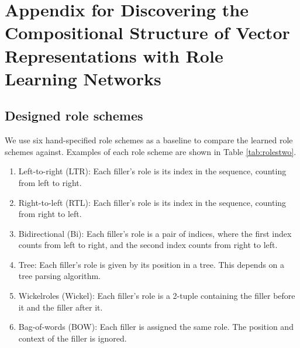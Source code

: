 \appendix 
\makeatletter
{}
\makeatother
\renewcommand{\thechapter}{\Alph{chapter}}

\chapter{Appendix for Discovering the Compositional Structure of Vector Representations with Role Learning Networks} \label{chap:appendix-a}

\section{Designed role schemes} \label{sec:role-schemes}
We use six hand-specified role schemes as a baseline to compare the learned role schemes against. Examples of each role scheme are shown in Table \ref{tab:rolestwo}.

\begin{enumerate}
	\item Left-to-right (LTR): Each filler's role is its index in the sequence, counting from left to right.
	\item Right-to-left (RTL): Each filler's role is its index in the sequence, counting from right to left.
	\item Bidirectional (Bi): Each filler's role is a pair of indices, where the first index counts from left to right, and the second index counts from right to left.
	\item Tree: Each filler's role is given by its position in a tree. This depends on a tree parsing algorithm.
	\item Wickelroles (Wickel): Each filler's role is a 2-tuple containing the filler before it and the filler after it. \citep{wickelgren1969context}
	\item Bag-of-words (BOW): Each filler is assigned the same role. The position and context of the filler is ignored.
\end{enumerate}

